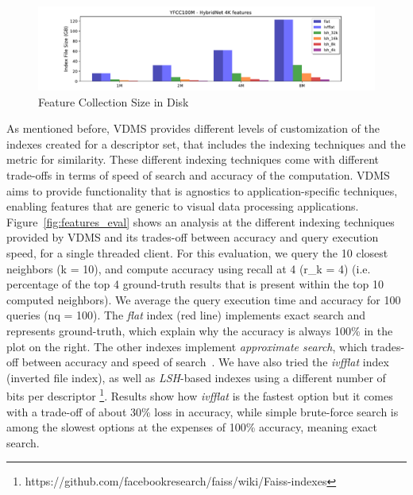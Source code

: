 \begin{figure}[ht]
\centering
\includegraphics[width=\textwidth]{figures/features_disksize}
\caption{Feature Collection Size in Disk}
\label{fig:features_size_does_matter}
\end{figure}

As mentioned before, VDMS provides different levels of customization of the
indexes created for a descriptor set, that includes the indexing techniques
and the metric for similarity.
These different indexing techniques come with different trade-offs in terms
of speed of search and accuracy of the computation.
VDMS aims to provide functionality that is agnostics to application-specific
techniques, enabling features that are generic to visual data processing
applications.
Figure~\ref{fig:features_eval} shows an analysis at the different indexing
techniques provided by VDMS and its trades-off between accuracy and query
execution speed, for a single threaded client.
For this evaluation, we query the 10 closest neighbors (k = 10), and compute
accuracy using recall at 4 (r\_k = 4) (i.e. percentage of the top 4 ground-truth
results that is present within the top 10 computed neighbors).
We average the query execution time and accuracy for 100 queries (nq = 100).
The \textit{flat} index (red line) implements exact search and
represents ground-truth, which explain why the
accuracy is always 100\% in the plot on the right.
The other indexes implement \textit{approximate search},
which trades-off between accuracy and speed of search~\cite{flann, faiss}.
We have also tried the \textit{ivfflat} index (inverted file index), as well as
\textit{LSH}-based indexes using a different number of bits per descriptor
\footnote{https://github.com/facebookresearch/faiss/wiki/Faiss-indexes}.
Results show how \textit{ivfflat} is the fastest option but it comes with a trade-off
of about 30\% loss in accuracy, while simple brute-force search
is among the slowest options at the expenses of 100\% accuracy,
meaning exact search.

